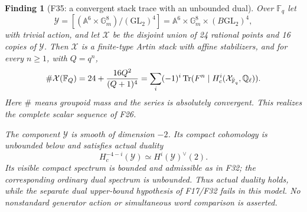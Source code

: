 \documentclass[11pt,a4paper]{article}
\newcommand{\Q}{\mathbb Q}\newcommand{\Z}{\mathbb Z}\newcommand{\C}{\mathbb C}\newcommand{\N}{\mathbb N}\newcommand{\F}{\mathbb F}
\newcommand{\A}{\mathbb A}\newcommand{\PP}{\mathbb P}\newcommand{\GL}{\mathrm{GL}}
\newcommand{\fid}[1]{\textsf{#1}}\newcommand{\gate}[1]{\textsf{#1}}
\theoremstyle{named}\newtheorem{finding}{Finding}[section]
\theoremstyle{definition}\newtheorem{definition}[finding]{Definition}
\theoremstyle{remark}\newtheorem{remark}[finding]{Remark}
\begin{document}
\begin{finding}[\fid{F35}: a convergent stack trace with an unbounded dual]\label{f:stacktrace}
Over $\F_q$ let
\[
 \mathcal Y=[(\A^6\times\mathbb G_m^8)/(\GL_2)^4]
   =\A^6\times\mathbb G_m^8\times(B\GL_2)^4,
\]
with trivial action, and let $\mathcal X$ be the disjoint union
of 24 rational points and 16 copies of $\mathcal Y$.
Then $\mathcal X$ is a finite-type Artin stack with affine stabilizers,
and for every $n\ge1$, with $Q=q^n$,
\begin{equation}\label{eq:stackwordtrace}
 \#\mathcal X(\F_Q)
 =24+\frac{16Q^2}{(Q+1)^4}
 =\sum_i(-1)^i\Tr(F^n\mid H_c^i(\mathcal X_{\bar{\F}_q},\Q_\ell)).
\end{equation}
Here $\#$ means groupoid mass and the series is absolutely convergent.
This realizes the complete scalar sequence of \fid{F26}.

The component $\mathcal Y$ is smooth of dimension $-2$.
Its compact cohomology is unbounded below and satisfies actual duality
\[
 H_c^{-4-i}(\mathcal Y)\simeq H^i(\mathcal Y)^\vee(2).
\]
Its visible compact spectrum is bounded and admissible as in
\fid{F32}; the corresponding ordinary dual spectrum is unbounded.
Thus actual duality holds, while the separate dual upper-bound
hypothesis of \fid{F17}/\fid{F32} fails in this model.
No nonstandard generator action or simultaneous word comparison
is asserted.
\end{finding}
\end{document}
